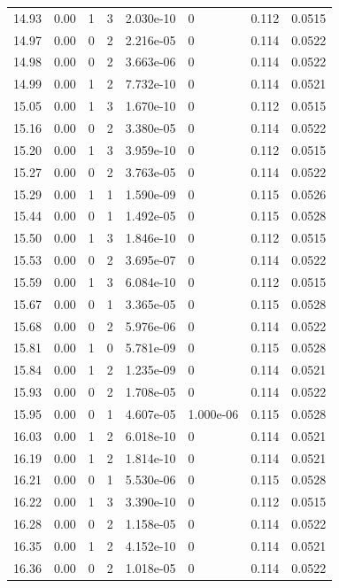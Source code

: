 \documentclass[preview]{standalone}
\begin{document}
{{{{{{\begin{tabular}{L{1.2cm}C{1.2cm} C{0.3cm}C{0.5cm} C{1.4cm}C{1.4cm} C{1.4cm}C{1.4cm}}
  14.93  &  0.00  & 1     &  3 &  2.030e-10  & 0  & 0.112 &  0.0515   \\ 
  14.97  &  0.00  & 0     &  2 &  2.216e-05  & 0  & 0.114 &  0.0522   \\ 
  14.98  &  0.00  & 0     &  2 &  3.663e-06  & 0  & 0.114 &  0.0522   \\ 
  14.99  &  0.00  & 1     &  2 &  7.732e-10  & 0  & 0.114 &  0.0521   \\ 
  15.05  &  0.00  & 1     &  3 &  1.670e-10  & 0  & 0.112 &  0.0515   \\ 
  15.16  &  0.00  & 0     &  2 &  3.380e-05  & 0  & 0.114 &  0.0522   \\ 
  15.20  &  0.00  & 1     &  3 &  3.959e-10  & 0  & 0.112 &  0.0515   \\ 
  15.27  &  0.00  & 0     &  2 &  3.763e-05  & 0  & 0.114 &  0.0522   \\ 
  15.29  &  0.00  & 1     &  1 &  1.590e-09  & 0  & 0.115 &  0.0526   \\ 
  15.44  &  0.00  & 0     &  1 &  1.492e-05  & 0  & 0.115 &  0.0528   \\ 
  15.50  &  0.00  & 1     &  3 &  1.846e-10  & 0  & 0.112 &  0.0515   \\ 
  15.53  &  0.00  & 0     &  2 &  3.695e-07  & 0  & 0.114 &  0.0522   \\ 
  15.59  &  0.00  & 1     &  3 &  6.084e-10  & 0  & 0.112 &  0.0515   \\ 
  15.67  &  0.00  & 0     &  1 &  3.365e-05  & 0  & 0.115 &  0.0528   \\ 
  15.68  &  0.00  & 0     &  2 &  5.976e-06  & 0  & 0.114 &  0.0522   \\ 
  15.81  &  0.00  & 1     &  0 &  5.781e-09  & 0  & 0.115 &  0.0528   \\ 
  15.84  &  0.00  & 1     &  2 &  1.235e-09  & 0  & 0.114 &  0.0521   \\ 
  15.93  &  0.00  & 0     &  2 &  1.708e-05  & 0  & 0.114 &  0.0522   \\ 
  15.95  &  0.00  & 0     &  1 &  4.607e-05  & 1.000e-06  & 0.115 &  0.0528   \\ 
  16.03  &  0.00  & 1     &  2 &  6.018e-10  & 0  & 0.114 &  0.0521   \\ 
  16.19  &  0.00  & 1     &  2 &  1.814e-10  & 0  & 0.114 &  0.0521   \\ 
  16.21  &  0.00  & 0     &  1 &  5.530e-06  & 0  & 0.115 &  0.0528   \\ 
  16.22  &  0.00  & 1     &  3 &  3.390e-10  & 0  & 0.112 &  0.0515   \\ 
  16.28  &  0.00  & 0     &  2 &  1.158e-05  & 0  & 0.114 &  0.0522   \\ 
  16.35  &  0.00  & 1     &  2 &  4.152e-10  & 0  & 0.114 &  0.0521   \\ 
  16.36  &  0.00  & 0     &  2 &  1.018e-05  & 0  & 0.114 &  0.0522   \\ 
\hline 
\end{tabular} 

}}}}}}
\end{document}
